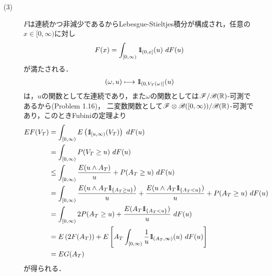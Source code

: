 \begin{prf}
\begin{description}
			\item[(3)] $F$は連続かつ非減少であるからLebesgue-Stieltjes積分が構成され，任意の$x \in [0,\infty)$に対し
				\begin{align}
					F(x) = \int_{[0,\infty)} \mbox{1}\hspace{-0.25em}\mbox{l}_{(0,x]}(u)\ dF(u)
				\end{align}
				が満たされる．
				\begin{align}
					(\omega,u) \longmapsto \mbox{1}\hspace{-0.25em}\mbox{l}_{(0,V_T(\omega)]}(u)
				\end{align}
				は，$u$の関数として左連続であり，また$\omega$の関数としては$\mathscr{F}/\mathscr{B}(\mathbb{R})$-可測であるから(Problem 1.16)，
				二変数関数として$\mathscr{F} \otimes \mathscr{B}([0,\infty))/\mathscr{B}(\mathbb{R})$-可測であり，このときFubiniの定理より
				\begin{align}
					E F(V_T) &= \int_{[0,\infty)} E\left( \mbox{1}\hspace{-0.25em}\mbox{l}_{[u,\infty)}(V_T) \right)\ dF(u) \\
					&= \int_{[0,\infty)} P(V_T \geq u)\ dF(u) \\
					&\leq \int_{[0,\infty)} \frac{E(u \wedge A_T)}{u} + P(A_T \geq u)\ dF(u) \\
					&= \int_{[0,\infty)} \frac{E(u \wedge A_T \mbox{1}\hspace{-0.25em}\mbox{l}_{\{A_T \geq u\}})}{u} + 
						\frac{E(u \wedge A_T \mbox{1}\hspace{-0.25em}\mbox{l}_{\{A_T < u\}})}{u} + P(A_T \geq u)\ dF(u) \\
					&= \int_{[0,\infty)} 2 P(A_T \geq u) + \frac{E(A_T \mbox{1}\hspace{-0.25em}\mbox{l}_{\{A_T < u\}})}{u}\ dF(u) \\
					&=  E\left(2F(A_T)\right) 
						+ E\left[A_T \int_{[0,\infty)} \frac{1}{u} \mbox{1}\hspace{-0.25em}\mbox{l}_{(A_T,\infty)}(u)\ dF(u)\right] \\
					&= EG(A_T)
				\end{align}
				が得られる．
				\QED
		\end{description}
	\end{prf}